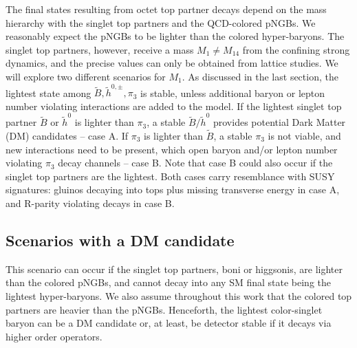 \documentclass[preprintnumbers,nofootinbib,showpacs,eqsecnum,pre,12pt]{revtex4-1}
\begin{document}
The final states resulting from octet top partner decays depend on the mass hierarchy with the singlet top partners and the QCD-colored pNGBs. We reasonably expect the pNGBs to be lighter than the colored hyper-baryons. The singlet top partners, however,  receive a mass $M_1 \neq M_{14}$ from the confining strong dynamics, and the precise values can only be obtained from lattice studies. We will explore two different scenarios for $M_1$. As discussed in the last section, the lightest state among $\tilde{B}, \tilde{h}^{0,\pm}, \pi_3$ is stable, unless additional baryon or lepton number violating interactions are added to the model. If the lightest singlet top partner $\tilde{B}$ or $\tilde{h}^0$ is lighter than $\pi_3$, a stable $\tilde{B}/\tilde{h}^0$ provides potential Dark Matter (DM) candidates -- case A. If $\pi_3$ is lighter than $\tilde{B}$, a stable $\pi_3$ is not viable, and new interactions need to be present, which open baryon and/or lepton number violating $\pi_3$ decay channels -- case B.  Note that case B could also occur if the singlet top partners are the lightest. Both cases carry resemblance with SUSY signatures: gluinos decaying into tops plus missing transverse energy in case A, and R-parity violating decays in case B.



\subsection{Scenarios with a DM candidate}
\label{sec:LHCphenoDM}

This scenario can occur if the singlet top partners,  boni or higgsonis, are lighter than the colored pNGBs, and cannot decay into any SM final state being the lightest hyper-baryons. We also assume throughout this work that the colored top partners are heavier than the pNGBs. Henceforth, the lightest color-singlet baryon can be a DM candidate or, at least, be detector stable if it decays via higher order operators.
\end{document}
